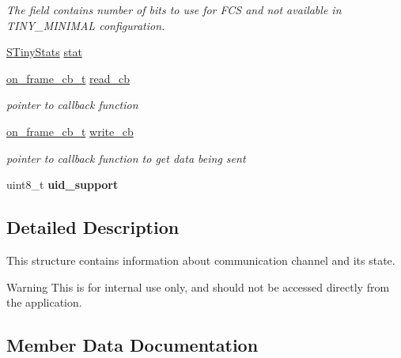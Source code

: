 \begin{DoxyCompactItemize}
\begin{DoxyCompactList}\small\item\em The field contains number of bits to use for F\+C\+S and not available in T\+I\+N\+Y\+\_\+\+M\+I\+N\+I\+M\+A\+L configuration. \end{DoxyCompactList}\item 
\hyperlink{structSTinyStats}{S\+Tiny\+Stats} \hyperlink{structSTinyData_a16ba8c9e60d6aee3fcd4909f85561f3d}{stat}
\item 
\hyperlink{tiny__layer2_8h_ad6bf709565b8aecb9e6ecf196f219d54}{on\+\_\+frame\+\_\+cb\+\_\+t} \hyperlink{structSTinyData_a31ba50154472c11e0d063b0aeef95f4d}{read\+\_\+cb}
\begin{DoxyCompactList}\small\item\em pointer to callback function \end{DoxyCompactList}\item 
\hyperlink{tiny__layer2_8h_ad6bf709565b8aecb9e6ecf196f219d54}{on\+\_\+frame\+\_\+cb\+\_\+t} \hyperlink{structSTinyData_ada334c88e86bfd2c10191f65818c3fb3}{write\+\_\+cb}
\begin{DoxyCompactList}\small\item\em pointer to callback function to get data being sent \end{DoxyCompactList}\item 
\hypertarget{structSTinyData_aa004bdc7db38cbbef4df4a4d94ca6a4b}{}uint8\+\_\+t {\bfseries uid\+\_\+support}\label{structSTinyData_aa004bdc7db38cbbef4df4a4d94ca6a4b}

\end{DoxyCompactItemize}


\subsection{Detailed Description}
This structure contains information about communication channel and its state. \begin{DoxyWarning}{Warning}
This is for internal use only, and should not be accessed directly from the application. 
\end{DoxyWarning}


\subsection{Member Data Documentation}
\hypertarget{structSTinyData_a31ba50154472c11e0d063b0aeef95f4d}{}
